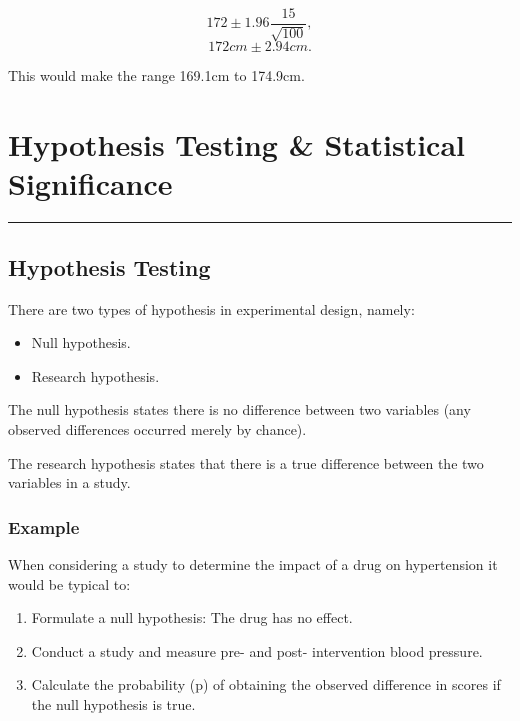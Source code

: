 \documentclass[
]{book}
\providecommand{\tightlist}{%
  \setlength{\itemsep}{0pt}\setlength{\parskip}{0pt}}
\begin{document}
\[172 \pm 1.96 \frac{15}{\sqrt{100}},\]
\[172cm \pm 2.94cm.\]

This would make the range 169.1cm to 174.9cm.

\hypertarget{hypothesis-testing-statistical-significance}{%
\chapter{Hypothesis Testing \& Statistical Significance}\label{hypothesis-testing-statistical-significance}}

\begin{center}\rule{0.5\linewidth}{0.5pt}\end{center}

\hypertarget{hypothesis-testing}{%
\section{Hypothesis Testing}\label{hypothesis-testing}}

There are two types of hypothesis in experimental design, namely:

\begin{itemize}
\tightlist
\item
  Null hypothesis.
\item
  Research hypothesis.
\end{itemize}

The null hypothesis states there is no difference between two variables (any observed differences occurred merely by chance).

The research hypothesis states that there is a true difference between the two variables in a study.

\hypertarget{example-16}{%
\subsection{Example}\label{example-16}}

When considering a study to determine the impact of a drug on hypertension it would be typical to:

\begin{enumerate}
\def\labelenumi{\arabic{enumi}.}
\tightlist
\item
  Formulate a null hypothesis: The drug has no effect.
\item
  Conduct a study and measure pre- and post- intervention blood pressure.
\item
  Calculate the probability (p) of obtaining the observed difference in scores if the null hypothesis is true.
\end{enumerate}
\end{document}
